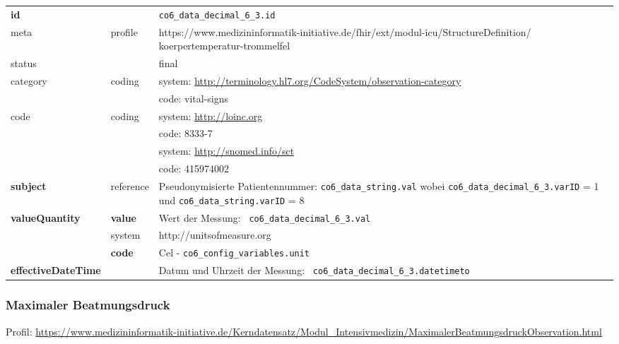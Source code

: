 \begin{longtable}{|l|l|p{7.5cm}|}
	\hline
	\rowcolor{lightgray} \multicolumn{3}{|l|}{Data Mapping (inhaltlich)} \\ \hline
	\textbf{id} &  & \texttt{co6\_data\_decimal\_6\_3.id} \\ \hline
	meta & profile & https://www.medizininformatik-initiative.de/fhir/ext/modul-icu/StructureDefinition/ koerpertemperatur-trommelfel \\ \hline 
	status &  & final   \\ \hline 
	category & coding & system: \url{http://terminology.hl7.org/CodeSystem/observation-category} \\
	\cline{3-3}
	& & code: vital-signs \\ \hline
	code & coding & system: \url{http://loinc.org} \\ 
	\cline{3-3} 
	&  & code: 8333-7 \\ 
	\cline{3-3} 
	&  & system: \url{http://snomed.info/sct} \\ 
	\cline{3-3}
	&  & code: 415974002 \\ \hline
	\textbf{subject} & reference & Pseudonymisierte Patientennummer: \texttt{co6\_data\_string.val} wobei \texttt{co6\_data\_decimal\_6\_3.varID} = 1 und \texttt{co6\_data\_string.varID} = 8 \\ \hline
	\textbf{valueQuantity}  & \textbf{value} & Wert der Messung: \texttt{
		co6\_data\_decimal\_6\_3.val} \\
	\cline{2-3}
	& system & http://unitsofmeasure.org \\
	\cline{2-3}
	& \textbf{code} & Cel - \texttt{co6\_config\_variables.unit} \\ \hline
	\textbf{effectiveDateTime}  & & Datum und Uhrzeit der Messung: \texttt{
		co6\_data\_decimal\_6\_3.datetimeto} \\ \hline
\end{longtable}

\subsubsection{Maximaler Beatmungsdruck} 
 Profil: \url{https://www.medizininformatik-initiative.de/Kerndatensatz/Modul_Intensivmedizin/MaximalerBeatmungsdruckObservation.html}

